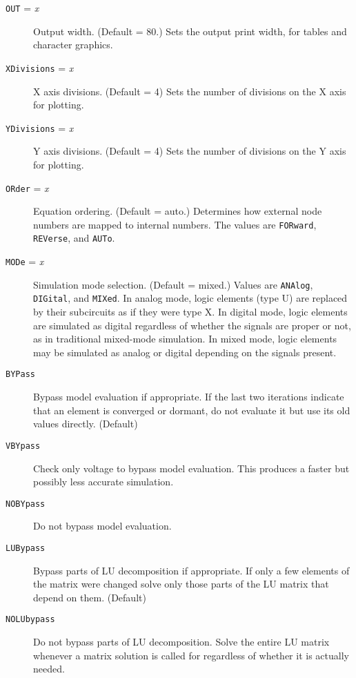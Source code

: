 \begin{description}
\item[{\tt OUT} = {\it x}] Output width.  (Default = 80.)
Sets the output print width, for tables and character graphics.

\item[{\tt XDivisions} = {\it x}]  X axis divisions. (Default = 4)
Sets the number of divisions on the X axis for plotting.

\item[{\tt YDivisions} = {\it x}]  Y axis divisions. (Default = 4)
Sets the number of divisions on the Y axis for plotting.

\item[{\tt ORder} = {\it x}] Equation ordering.  (Default = auto.)
Determines how external node numbers are mapped to internal numbers.  The
values are {\tt FORward}, {\tt REVerse}, and {\tt AUTo}.

\item[{\tt MODe} = {\it x}] Simulation mode selection.  (Default = mixed.)
Values are {\tt ANAlog}, {\tt DIGital}, and {\tt MIXed}.  In analog mode,
logic elements (type U) are replaced by their subcircuits as if they were
type X.  In digital mode, logic elements are simulated as digital regardless
of whether the signals are proper or not, as in traditional mixed-mode
simulation.  In mixed mode, logic elements may be simulated as analog or
digital depending on the signals present.

\item[{\tt BYPass}] Bypass model evaluation if appropriate.  If the last two
iterations indicate that an element is converged or dormant, do not evaluate
it but use its old values directly.  (Default)

\item[{\tt VBYpass}] Check only voltage to bypass model evaluation.  This
produces a faster but possibly less accurate simulation.

\item[{\tt NOBYpass}] Do not bypass model evaluation.

\item[{\tt LUBypass}] Bypass parts of LU decomposition if appropriate.  If
only a few elements of the matrix were changed solve only those parts
of the LU matrix that depend on them.  (Default)

\item[{\tt NOLUbypass}] Do not bypass parts of LU decomposition.  Solve
the entire LU matrix whenever a matrix solution is called for regardless
of whether it is actually needed.  


\end{description}
